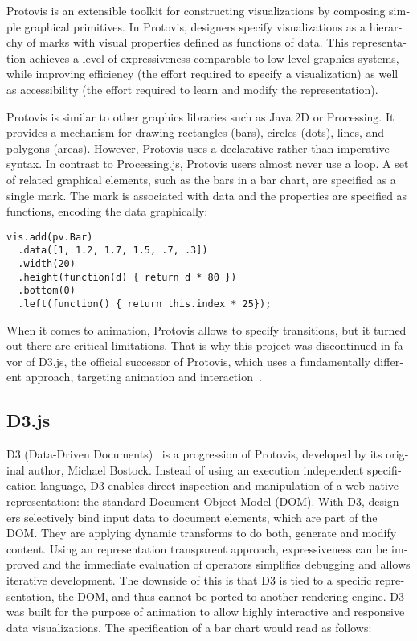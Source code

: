 \begin{english}
Protovis is an extensible toolkit for constructing visualizations by composing simple graphical primitives. In Protovis, designers specify visualizations as a hierarchy of marks with visual properties defined as functions of data. This representation achieves a level of expressiveness comparable to low-level graphics systems, while improving efficiency (the effort required to specify a visualization) as well as accessibility (the effort required to learn and modify the representation).

Protovis is similar to other graphics libraries such as Java 2D or Processing. It provides a mechanism for drawing rectangles (bars), circles (dots), lines, and polygons (areas). However, Protovis uses a declarative rather than imperative syntax. In contrast to Processing.js, Protovis users almost never use a loop. A set of related graphical elements, such as the bars in a bar chart, are specified as a single mark. The mark is associated with data and the properties are specified as functions, encoding the data graphically:

\begin{verbatim}
vis.add(pv.Bar)
  .data([1, 1.2, 1.7, 1.5, .7, .3])
  .width(20)
  .height(function(d) { return d * 80 })
  .bottom(0)
  .left(function() { return this.index * 25});
\end{verbatim}

\SuperPar When it comes to animation, Protovis allows to specify transitions, but it turned out there are critical limitations. That is why this project was discontinued in favor of D3.js, the official successor of Protovis, which uses a fundamentally different approach, targeting animation and interaction~\cite{D3}.


\subsection{D3.js}

D3 (Data-Driven Documents)~\cite{D3} is a progression of Protovis, developed by its original author, Michael Bostock. Instead of using an execution independent specification language, D3 enables direct inspection and manipulation of a web-native representation: the standard Document Object Model (DOM). With D3, designers selectively bind input data to document elements, which are part of the DOM. They are applying dynamic transforms to do both, generate and modify content. Using an representation transparent approach, expressiveness can be improved and the immediate evaluation of operators simplifies debugging and allows iterative development. The downside of this is that D3 is tied to a specific representation, the DOM, and thus cannot be ported to another rendering engine. D3 was built for the purpose of animation to allow highly interactive and responsive data visualizations. The specification of a bar chart would read as follows:


\end{english}
